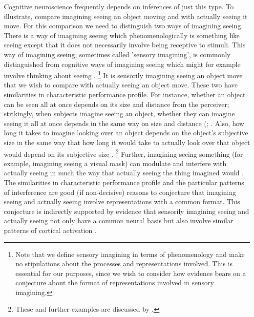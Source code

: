 \documentclass[12pt,\papersize]{extarticle}
\begin{document}
Cognitive neuroscience frequently depends on inferences of just this type. To illustrate, compare imagining seeing an object moving and with actually seeing it move. For this comparison we need to distinguish two ways of imagining seeing. There is a way of imagining seeing which phenomenologically is something like seeing except that it does not necessarily involve being receptive to stimuli. This way of imagining seeing, sometimes called 'sensory imagining', is commonly distinguished from cognitive ways of imagining seeing which might for example involve thinking about seeing \citep[§2.1]{Gendler:2011_imagination}.%
\footnote{Note that we define sensory imagining in terms of phenomenology and make no stipulations about the processes and representations involved.  This is essential for our purposes, since we wish to consider how evidence bears on a conjecture about the format of representations involved in sensory imagining.}
It is sensorily imagining seeing an object move that we wish to compare with actually seeing an object move.  These two have similarities in characteristic performance profile.  For instance, whether an object can be seen all at once depends on its size and distance from the perceiver; strikingly, when subjects imagine seeing an object, whether they can imagine seeing it all at once depends in the same way on size and distance (\citealp{kosslyn:1978_measuring}; \citealp[p.\ 99ff]{kosslyn:1994_image}.  Also, how long it takes to imagine looking over an object depends on the object's subjective size in the same way that how long it would take to actually look over that object would depend on its subjective size \citep{kosslyn:1978_visual}.%
\footnote{These and further examples are discussed by \citet[p.\ 165]{currie:1997_mental}.} Further, imagining seeing something (for example, imagining seeing a visual mask) can modulate and interfere with actually seeing in much the way that actually seeing the thing imagined would \citep{pearson:2008_functional,ishai:1995_common}. The similarities in characteristic performance profile and the particular patterns of interference are good (if non-decisive) reasons to conjecture that imagining seeing and actually seeing involve representations with a common format.  This conjecture is indirectly supported by evidence that sensorily imagining seeing and actually seeing not only have a common neural basis but also involve similar patterns of cortical activation \citep[e.g.][]{page:2011_erp}.
\end{document}
